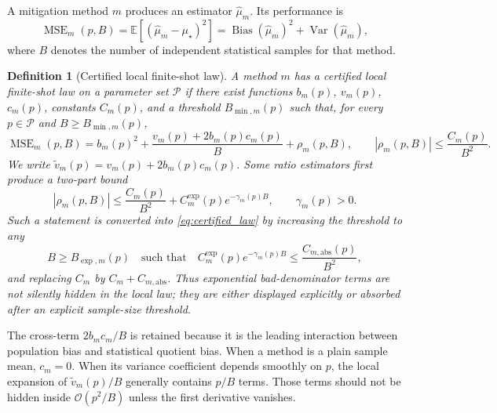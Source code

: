 \documentclass[11pt]{article}
\newtheorem{definition}{Definition}
\newcommand{\MSE}{\operatorname{MSE}}
\newcommand{\Bias}{\operatorname{Bias}}
\newcommand{\Var}{\operatorname{Var}}
\newcommand{\E}{\mathbb{E}}
\newcommand{\1}{\mathbf{1}}
\newcommand{\OO}{\mathcal{O}}
\newcommand{\abs}[1]{\left\lvert #1 \right\rvert}
\begin{document}
A mitigation method \(m\) produces an estimator \(\widehat\mu_m\).  Its performance is
\begin{equation}
    \MSE_m(p,B)=\E[(\widehat\mu_m-\mu_\star)^2]
    =\Bias(\widehat\mu_m)^2+\Var(\widehat\mu_m),
\end{equation}
where \(B\) denotes the number of independent statistical samples for that method.

\begin{definition}[Certified local finite-shot law]
\label{def:certified_law}
A method \(m\) has a certified local finite-shot law on a parameter set \(\mathcal P\) if there exist functions \(b_m(p)\), \(v_m(p)\), \(c_m(p)\), constants \(C_m(p)\), and a threshold \(B_{\min,m}(p)\) such that, for every \(p\in\mathcal P\) and \(B\geq B_{\min,m}(p)\),
\begin{equation}
    \MSE_m(p,B)=b_m(p)^2+\frac{v_m(p)+2b_m(p)c_m(p)}{B}+\rho_m(p,B),
    \qquad
    \abs{\rho_m(p,B)}\leq \frac{C_m(p)}{B^2}.
    \label{eq:certified_law}
\end{equation}
We write \(\widetilde v_m(p)=v_m(p)+2b_m(p)c_m(p)\).  Some ratio estimators first produce a two-part bound
\begin{equation}
    \abs{\rho_m(p,B)}
    \leq \frac{C_m(p)}{B^2}+C_m^{\exp}(p)e^{-\gamma_m(p)B},
    \qquad \gamma_m(p)>0.
    \label{eq:certified_law_with_exp}
\end{equation}
Such a statement is converted into \cref{eq:certified_law} by increasing the threshold to any
\begin{equation}
    B\geq B_{\exp,m}(p)
    \quad\text{such that}\quad
    C_m^{\exp}(p)e^{-\gamma_m(p)B}\leq \frac{C_{m,\mathrm{abs}}(p)}{B^2},
    \label{eq:exponential_absorption_threshold}
\end{equation}
and replacing \(C_m\) by \(C_m+C_{m,\mathrm{abs}}\).  Thus exponential bad-denominator terms are not silently hidden in the local law; they are either displayed explicitly or absorbed after an explicit sample-size threshold.
\end{definition}

The cross-term \(2b_mc_m/B\) is retained because it is the leading interaction between population bias and statistical quotient bias.  When a method is a plain sample mean, \(c_m=0\).  When its variance coefficient depends smoothly on \(p\), the local expansion of \(\widetilde v_m(p)/B\) generally contains \(p/B\) terms.  Those terms should not be hidden inside \(\OO(p^2/B)\) unless the first derivative vanishes.
\end{document}
